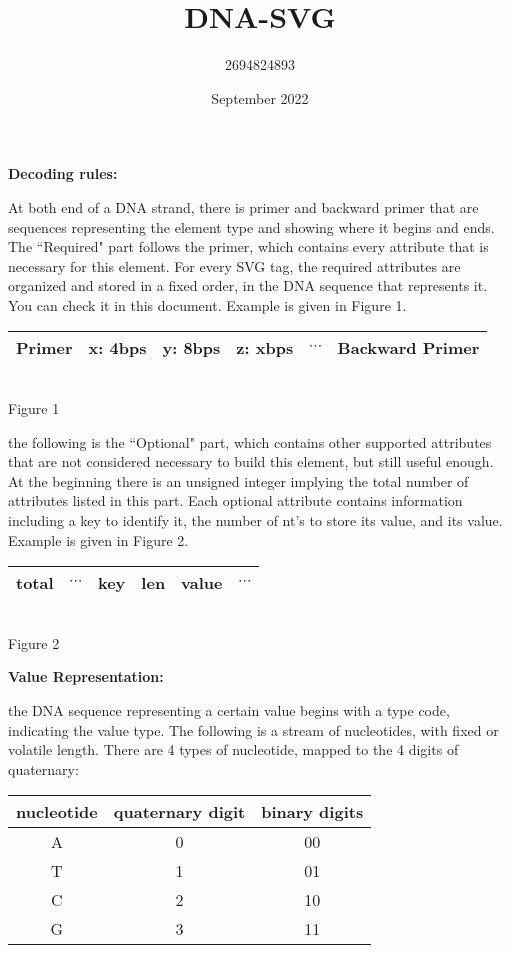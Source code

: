 \documentclass{article}
\title{DNA-SVG}
\author{2694824893 }
\date{September 2022}
\begin{document}
\noindent
{\fontsize{12pt}{14.4pt}\textbf{Decoding rules:}}
\par At both end of a DNA strand, there is primer and backward primer that are sequences representing the element type and showing where it begins and ends. The ``Required" part follows the primer, which contains every attribute that is necessary for this element. For every SVG tag, the required attributes are organized and stored in a fixed order, in the DNA sequence that represents it. You can check it in this document. Example is given in Figure 1. 
\begin{center}
    \begin{tabular}{c|c|c|c|c|c}
        \hline 
        Primer & x: 4bps & y: 8bps & z: xbps & $\cdots$ & Backward Primer\\
        \hline
    \end{tabular}\\[4pt]
    Figure 1
\end{center}
\par the following is the ``Optional" part, which contains other supported attributes that are not considered necessary to build this element, but still useful enough. At the beginning there is an unsigned integer implying the total number of attributes listed in this part. Each optional attribute contains information including a key to identify it, the number of nt's to store its value, and its value. Example is given in Figure 2. 
\begin{center}
    \begin{tabular}{c|c|c|c|c|c}
        \hline 
        total & $\cdots$ & key & len & value & $\cdots$ \\
        \hline
    \end{tabular}\\[4pt]
    Figure 2
\end{center}
{\fontsize{12pt}{14.4pt}\textbf{Value Representation:}}
\par the DNA sequence representing a certain value begins with a type code, indicating the value type. The following is a stream of nucleotides, with fixed or volatile length. There are 4 types of nucleotide, mapped to the 4 digits of quaternary:
\begin{center}
    \begin{tabular}{c|c|c}
        nucleotide & quaternary digit & binary digits \\
        \hline
        A & 0 & 00 \\
        T & 1 & 01 \\
        C & 2 & 10 \\
        G & 3 & 11 \\
    \end{tabular}
\end{center}
\end{document}
